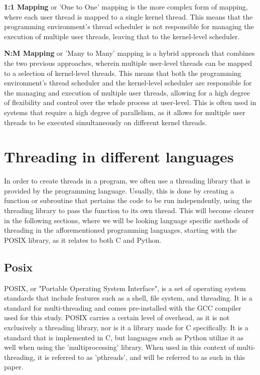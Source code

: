\documentclass[12pt,a4paper]{article}
\begin{document}
\textbf{1:1 Mapping} or 'One to One' mapping is the more complex form of mapping, where each user thread is mapped to a single kernel thread. This means that the programming environment's thread scheduler is not responsible for managing the execution of multiple user threads, leaving that to the kernel-level scheduler.

\textbf{N:M Mapping} or 'Many to Many' mapping is a hybrid approach that combines the two previous approaches, wherein multiple user-level threads can be mapped to a selection of kernel-level threads. This means that both the programming environment's thread scheduler and the kernel-level scheduler are responsible for the managing and execution of multiple user threads, allowing for a high degree of flexibility and control over the whole process at user-level. This is often used in systems that require a high degree of parallelism, as it allows for multiple user threads to be executed simultaneously on different kernel threads.

\section{Threading in different languages}

In order to create threads in a program, we often use a threading library that is provided by the programming language. Usually, this is done by creating a function or subroutine that pertains the code to be run independently, using the threading library to pass the function to its own thread. This will become clearer in the following sections, where we will be looking language specific methods of threading in the afforementioned programming languages, starting with the POSIX library, as it relates to both C and Python.

\subsection{Posix}

POSIX, or "Portable Operating System Interface"\parencite{GNUPOSIX,POSIXDocs}, is a set of operating system standards that include features such as a shell, file system, and threading. It is a standard for multi-threading and comes pre-installed with the GCC compiler\parencite{GNUPOSIX} used for this study. POSIX carries a certain level of overhead, as it is not exclusively a threading library, nor is it a library made for C specifically. It is a standard that is implemented in C, but languages such as Python utilize it as well when using the 'multiprocessing' library. When used in this context of multi-threading, it is referred to as 'pthreads', and will be referred to as such in this paper.
\end{document}

